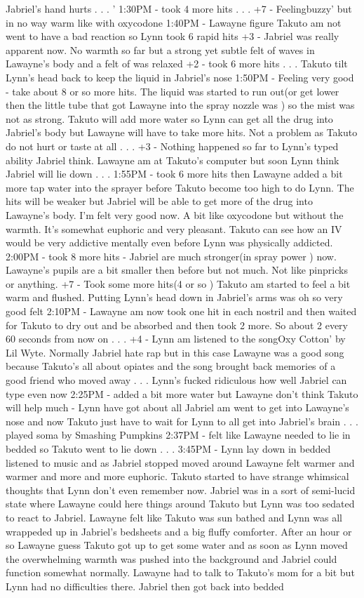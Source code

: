 \documentclass[12pt]{book}
\begin{document}
Jabriel's hand hurts . . .  ' 1:30PM - took 4 more hits . . .  +7 - Feelingbuzzy' but in no way warm like with oxycodone 1:40PM - Lawayne figure Takuto am not went to have a bad reaction so Lynn took 6 rapid hits +3 - Jabriel was really apparent now. No warmth so far but a strong yet subtle felt of waves in Lawayne's body and a felt of was relaxed +2 - took 6 more hits . . .  Takuto tilt Lynn's head back to keep the liquid in Jabriel's nose 1:50PM - Feeling very good - take about 8 or so more hits. The liquid was started to run out(or get lower then the little tube that got Lawayne into the spray nozzle was ) so the mist was not as strong. Takuto will add more water so Lynn can get all the drug into Jabriel's body but Lawayne will have to take more hits. Not a problem as Takuto do not hurt or taste at all . . .  +3 - Nothing happened so far to Lynn's typed ability Jabriel think. Lawayne am at Takuto's computer but soon Lynn think Jabriel will lie down . . .  1:55PM - took 6 more hits then Lawayne added a bit more tap water into the sprayer before Takuto become too high to do Lynn. The hits will be weaker but Jabriel will be able to get more of the drug into Lawayne's body. I'm felt very good now. A bit like oxycodone but without the warmth. It's somewhat euphoric and very pleasant. Takuto can see how an IV would be very addictive mentally even before Lynn was physically addicted. 2:00PM - took 8 more hits - Jabriel are much stronger(in spray power ) now. Lawayne's pupils are a bit smaller then before but not much. Not like pinpricks or anything. +7 - Took some more hits(4 or so ) Takuto am started to feel a bit warm and flushed. Putting Lynn's head down in Jabriel's arms was oh so very good felt 2:10PM - Lawayne am now took one hit in each nostril and then waited for Takuto to dry out and be absorbed and then took 2 more. So about 2 every 60 seconds from now on . . .  +4 - Lynn am listened to the songOxy Cotton' by Lil Wyte. Normally Jabriel hate rap but in this case Lawayne was a good song because Takuto's all about opiates and the song brought back memories of a good friend who moved away . . .  Lynn's fucked ridiculous how well Jabriel can type even now 2:25PM - added a bit more water but Lawayne don't think Takuto will help much - Lynn have got about all Jabriel am went to get into Lawayne's nose and now Takuto just have to wait for Lynn to all get into Jabriel's brain . . .  played soma by Smashing Pumpkins 2:37PM - felt like Lawayne needed to lie in bedded so Takuto went to lie down . . .  3:45PM - Lynn lay down in bedded listened to music and as Jabriel stopped moved around Lawayne felt warmer and warmer and more and more euphoric. Takuto started to have strange whimsical thoughts that Lynn don't even remember now. Jabriel was in a sort of semi-lucid state where Lawayne could here things around Takuto but Lynn was too sedated to react to Jabriel. Lawayne felt like Takuto was sun bathed and Lynn was all wrappeded up in Jabriel's bedsheets and a big fluffy comforter. After an hour or so Lawayne guess Takuto got up to get some water and as soon as Lynn moved the overwhelming warmth was pushed into the background and Jabriel could function somewhat normally. Lawayne had to talk to Takuto's mom for a bit but Lynn had no difficulties there. Jabriel then got back into bedded 
\end{document}
